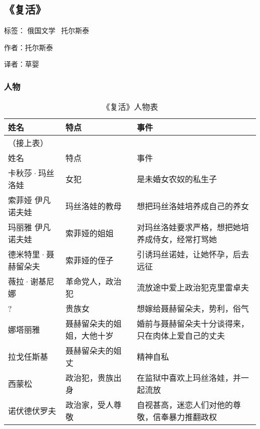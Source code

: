 \subsection{《复活》} 

标签： 俄国文学 \ 托尔斯泰

作者：托尔斯泰

译者：草婴

\subsubsection{人物}

\begin{longtable}{p{} | p{} | p{}}

    \caption{《复活》人物表} \\
    \hline
姓名 & 特点 & 事件 \\
\hline
\endfirsthead

（接上表） \\
姓名 & 特点 & 事件 \\
\hline
\endhead

\hline
\endfoot

卡秋莎·玛丝洛娃 & 女犯 & 是未婚女农奴的私生子 \\
索菲娅 伊凡诺夫娃 & 玛丝洛娃的教母 & 想把玛丝洛娃培养成自己的养女 \\
玛丽雅 伊凡诺夫娃 & 索菲娅的姐姐 & 对玛丝洛娃要求严格，想把她培养成侍女，经常打骂她 \\
德米特里·聂赫留朵夫 & 索菲娅的侄子 & 引诱玛丝诺娃，让她怀孕，后去远征 \\
薇拉·谢基尼娜 & 革命党人，政治犯 & 流放途中爱上政治犯克里雷卓夫 \\
? & 贵族女 & 想嫁给聂赫留朵夫，势利，俗气 \\
娜塔丽雅 & 聂赫留朵夫的姐姐，大他十岁 & 婚前与聂赫留朵夫十分谈得来，只在肉体上爱自己的丈夫 \\
拉戈任斯基 & 聂赫留朵夫的姐丈 & 精神自私 \\
西蒙松 & 政治犯，贵族出身 & 在监狱中喜欢上玛丝洛娃，并一起流放 \\ 
诺伏德伏罗夫 & 政治家，受人尊敬 & 自视甚高，迷恋人们对他的尊敬，信奉暴力推翻政权 \\
\end{longtable}

